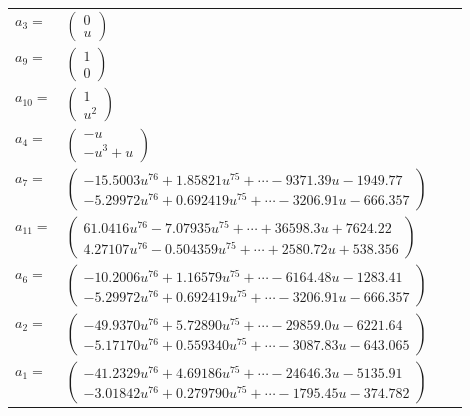 \documentclass[1p]{elsarticle_modified}
\theoremstyle{definition}
\begin{document}
\begin{tabular}{m{7pt} m{180pt} m{7pt} m{180pt} }
\flushright $a_{3}=$&$\begin{pmatrix}0\\u\end{pmatrix}$ \\
\flushright $a_{9}=$&$\begin{pmatrix}1\\0\end{pmatrix}$ \\
\flushright $a_{10}=$&$\begin{pmatrix}1\\u^2\end{pmatrix}$ \\
\flushright $a_{4}=$&$\begin{pmatrix}- u\\- u^3+u\end{pmatrix}$ \\
\flushright $a_{7}=$&$\begin{pmatrix}-15.5003 u^{76}+1.85821 u^{75}+\cdots-9371.39 u-1949.77\\-5.29972 u^{76}+0.692419 u^{75}+\cdots-3206.91 u-666.357\end{pmatrix}$ \\
\flushright $a_{11}=$&$\begin{pmatrix}61.0416 u^{76}-7.07935 u^{75}+\cdots+36598.3 u+7624.22\\4.27107 u^{76}-0.504359 u^{75}+\cdots+2580.72 u+538.356\end{pmatrix}$ \\
\flushright $a_{6}=$&$\begin{pmatrix}-10.2006 u^{76}+1.16579 u^{75}+\cdots-6164.48 u-1283.41\\-5.29972 u^{76}+0.692419 u^{75}+\cdots-3206.91 u-666.357\end{pmatrix}$ \\
\flushright $a_{2}=$&$\begin{pmatrix}-49.9370 u^{76}+5.72890 u^{75}+\cdots-29859.0 u-6221.64\\-5.17170 u^{76}+0.559340 u^{75}+\cdots-3087.83 u-643.065\end{pmatrix}$ \\
\flushright $a_{1}=$&$\begin{pmatrix}-41.2329 u^{76}+4.69186 u^{75}+\cdots-24646.3 u-5135.91\\-3.01842 u^{76}+0.279790 u^{75}+\cdots-1795.45 u-374.782\end{pmatrix}$ \\

\end{tabular}
\end{document}
